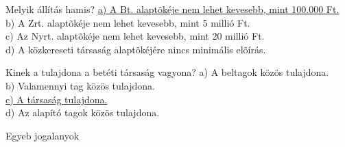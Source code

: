 \begin{frame}

\begin{tcolorbox}[title={77. Kérdés}]
Melyik állítás hamis?
\tcblower
\uline {a) A Bt. alaptõkéje nem lehet kevesebb, mint 100.000 Ft.}\\
b) A Zrt. alaptõkéje nem lehet kevesebb, mint 5 millió Ft.\\
c) Az Nyrt. alaptõkéje nem lehet kevesebb, mint 20 millió Ft.\\
d) A közkereseti társaság alaptõkéjére nincs minimális elõírás.
\end{tcolorbox}

\begin{tcolorbox}[title={78. Kérdés}]
Kinek a tulajdona a betéti társaság vagyona?
\tcblower
a) A beltagok közös tulajdona.\\
b) Valamennyi tag közös tulajdona.\\
\uline {c) A társaság tulajdona.}\\
d) Az alapító tagok közös tulajdona.
\end{tcolorbox}

\end{frame}

\begin{frame}[plain]
\begin{tcolorbox}[center, colback={myyellow}, coltext={black}, colframe={myyellow}]
    { Egyeb jogalanyok}\\
\end{tcolorbox}
\end{frame}

